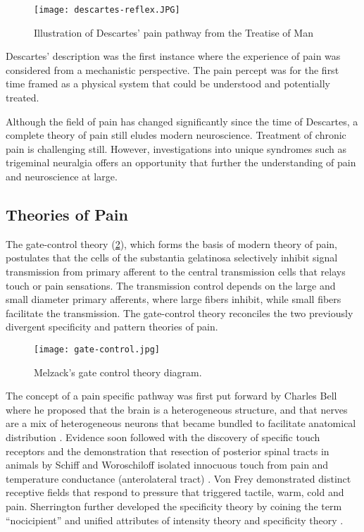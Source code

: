 \begin{figure}[ht]
\texttt{[image: descartes-reflex.JPG]}
\centering
\caption{Illustration of Descartes' pain pathway from the Treatise of Man}
\label{fig:descarte}
\end{figure}

Descartes' description was the first instance where the experience of pain was considered from a mechanistic perspective. The pain percept was for the first time framed as a physical system that could be understood and potentially treated. 

Although the field of pain has changed significantly since the time of Descartes, a complete theory of pain still eludes modern neuroscience. Treatment of chronic pain is challenging still. However, investigations into unique syndromes such as trigeminal neuralgia offers an opportunity that further the understanding of pain and neuroscience at large. 

\subsection{Theories of Pain}

The gate-control theory \cite{Melzack1965a} (\ref{fig:gate-theory}), which forms the basis of modern theory of pain, postulates that the cells of the substantia gelatinosa selectively inhibit signal transmission from primary afferent to the central transmission cells that relays touch or pain sensations. The transmission control depends on the large and small diameter primary afferents, where large fibers inhibit, while small fibers facilitate the transmission. The gate-control theory reconciles the two previously divergent specificity and pattern theories of pain.

 \begin{figure}[ht]
 \texttt{[image: gate-control.jpg]}
 \centering
 \caption{Melzack's gate control theory diagram.}
 \label{fig:gate-theory} 
 \end{figure}
 
The concept of a pain specific pathway was first put forward by Charles Bell where he proposed that the brain is a heterogeneous structure, and that nerves are a mix of heterogeneous neurons that became bundled to facilitate anatomical distribution \cite{Bell1868}. Evidence soon followed with the discovery of specific touch receptors and the demonstration that resection of posterior spinal tracts in animals by Schiff and Woroschiloff isolated innocuous touch from pain and temperature conductance (anterolateral tract) \cite{Dallenbach1939}. Von Frey demonstrated distinct receptive fields that respond to pressure that triggered tactile, warm, cold and pain. Sherrington further developed the specificity theory by coining the term “nocicipient” and unified attributes of intensity theory and specificity theory \cite{Casey1982}.


